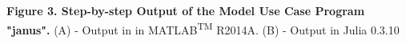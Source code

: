 \textbf{Figure 3. Step-by-step Output of the Model Use Case Program "janus".} (A) - Output in  in MATLAB\textsuperscript{TM} R2014A. (B) - Output in Julia 0.3.10
  
  
  
  